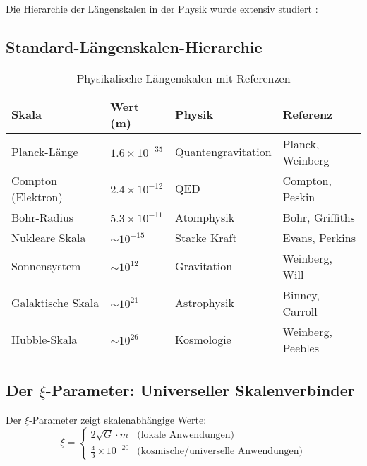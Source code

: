 \documentclass[12pt,a4paper]{article}
\begin{document}
	Die Hierarchie der Längenskalen in der Physik wurde extensiv studiert \citep{weinberg1995,wilczek2001,carr2007}:
	
	\subsection{Standard-Längenskalen-Hierarchie}
	\label{subsec:standard_hierarchy}
	
	\begin{table}[htbp]
		\centering
		\footnotesize
		\begin{tabular}{p{2.5cm}p{2.2cm}p{2cm}p{4.5cm}}
			\toprule
			\textbf{Skala} & \textbf{Wert (m)} & \textbf{Physik} & \textbf{Referenz} \\
			\midrule
			Planck-Länge & $1.6 \times 10^{-35}$ & Quantengravitation & Planck, Weinberg \\
			Compton (Elektron) & $2.4 \times 10^{-12}$ & QED & Compton, Peskin \\
			Bohr-Radius & $5.3 \times 10^{-11}$ & Atomphysik & Bohr, Griffiths \\
			Nukleare Skala & $\sim 10^{-15}$ & Starke Kraft & Evans, Perkins \\
			Sonnensystem & $\sim 10^{12}$ & Gravitation & Weinberg, Will \\
			Galaktische Skala & $\sim 10^{21}$ & Astrophysik & Binney, Carroll \\
			Hubble-Skala & $\sim 10^{26}$ & Kosmologie & Weinberg, Peebles \\
			\bottomrule
		\end{tabular}
		\caption{Physikalische Längenskalen mit Referenzen}
		\label{tab:length_scales}
	\end{table}
	
	\subsection{Der $\xi$-Parameter: Universeller Skalenverbinder}
	\label{subsec:xi_universal}
	\label{sec:xi_derivation}
	
	Der $\xi$-Parameter zeigt skalenabhängige Werte:
	\begin{equation}
		\xi = \begin{cases}
			2\sqrt{G} \cdot m & \text{(lokale Anwendungen)} \\
			\frac{4}{3} \times 10^{-20} & \text{(kosmische/universelle Anwendungen)}
		\end{cases}
	\end{equation}
	
\end{document}
